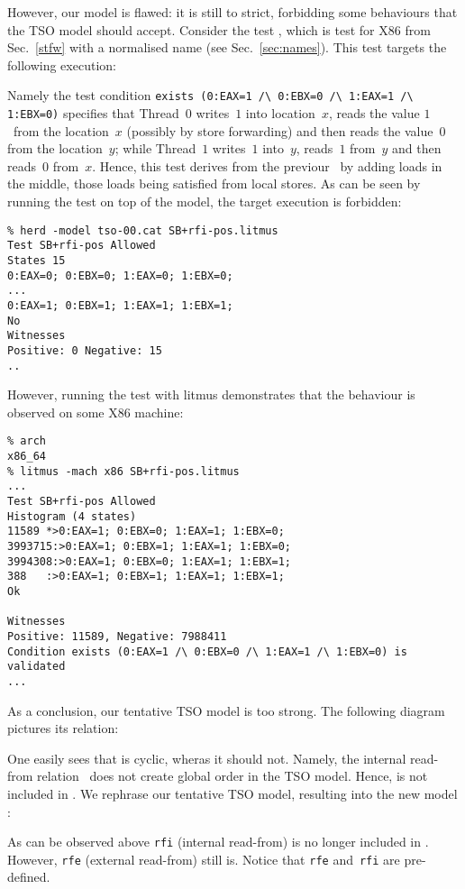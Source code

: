However,
our model  is flawed: it is still to strict,
forbidding some behaviours that the TSO model should accept.
Consider the test ,
which is test  for X86 from Sec.~\ref{stfw} with a normalised name (see Sec.~\ref{sec:names}).
This test targets the following execution:
\begin{center}\end{center}
Namely the test condition
\verb+exists (0:EAX=1 /\ 0:EBX=0 /\ 1:EAX=1 /\ 1:EBX=0)+
specifies that Thread~$0$ writes~$1$ into location~$x$,
reads the value $1$~from the location~$x$ (possibly by store forwarding) and
then reads the value~$0$ from the location~$y$;
while Thread~$1$ writes~$1$ into~$y$,
reads~$1$ from~$y$ and then reads~$0$ from~$x$.
Hence, this test derives from the previour~
by adding loads in the middle, those loads
being  satisfied from local stores.
As can be seen by running the test on top of the 
model, the target execution is forbidden:
\begin{verbatim}
% herd -model tso-00.cat SB+rfi-pos.litmus 
Test SB+rfi-pos Allowed
States 15
0:EAX=0; 0:EBX=0; 1:EAX=0; 1:EBX=0;
...
0:EAX=1; 0:EBX=1; 1:EAX=1; 1:EBX=1;
No
Witnesses
Positive: 0 Negative: 15
..
\end{verbatim}
However, running the test with litmus demonstrates that the behaviour
is observed on some X86 machine:
\begin{verbatim}
% arch
x86_64
% litmus -mach x86 SB+rfi-pos.litmus
...
Test SB+rfi-pos Allowed
Histogram (4 states)
11589 *>0:EAX=1; 0:EBX=0; 1:EAX=1; 1:EBX=0;
3993715:>0:EAX=1; 0:EBX=1; 1:EAX=1; 1:EBX=0;
3994308:>0:EAX=1; 0:EBX=0; 1:EAX=1; 1:EBX=1;
388   :>0:EAX=1; 0:EBX=1; 1:EAX=1; 1:EBX=1;
Ok

Witnesses
Positive: 11589, Negative: 7988411
Condition exists (0:EAX=1 /\ 0:EBX=0 /\ 1:EAX=1 /\ 1:EBX=0) is validated
...
\end{verbatim}
As a conclusion, our tentative TSO model is too strong.
The following diagram pictures its  relation:
\begin{center}\end{center}
One easily sees that  is cyclic, wheras it should not.
Namely, the internal read-from relation~ does
not create global order in the TSO model.
Hence,  is not included in .
We rephrase our tentative TSO model, resulting into the new model
:

As can be observed above \texttt{rfi} (internal read-from) is no longer
included in . However, \texttt{rfe} (external read-from)
still is. Notice that \texttt{rfe} and~\texttt{rfi} are pre-defined.



